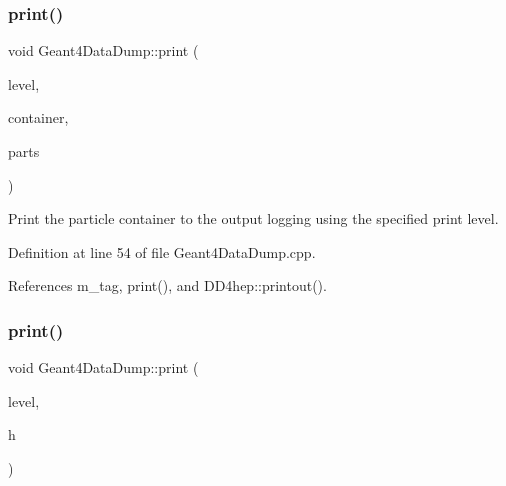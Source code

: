 \hypertarget{class_d_d4hep_1_1_simulation_1_1_geant4_data_dump_a50918352a7c46d20e94d26b4cf5d5e39}{}\label{class_d_d4hep_1_1_simulation_1_1_geant4_data_dump_a50918352a7c46d20e94d26b4cf5d5e39} 
\subsubsection{\texorpdfstring{print()}{print()}\hspace{0.1cm}{\footnotesize\ttfamily [2/6]}}
{\footnotesize\ttfamily void Geant4\+Data\+Dump\+::print (\begin{DoxyParamCaption}\item[{\hyperlink{namespace_d_d4hep_a5b5a64d56252469451f2020a27d57d42}{Print\+Level}}]{level,  }\item[{const std\+::string \&}]{container,  }\item[{const \hyperlink{class_d_d4hep_1_1_simulation_1_1_geant4_data_dump_a78b5910af0db1442a14600ae8dfc2a92}{Particles} $\ast$}]{parts }\end{DoxyParamCaption})}



Print the particle container to the output logging using the specified print level. 



Definition at line 54 of file Geant4\+Data\+Dump.\+cpp.



References m\+\_\+tag, print(), and D\+D4hep\+::printout().

\hypertarget{class_d_d4hep_1_1_simulation_1_1_geant4_data_dump_af3765022b8a03075fde40b2129b468e8}{}\label{class_d_d4hep_1_1_simulation_1_1_geant4_data_dump_af3765022b8a03075fde40b2129b468e8} 
\subsubsection{\texorpdfstring{print()}{print()}\hspace{0.1cm}{\footnotesize\ttfamily [3/6]}}
{\footnotesize\ttfamily void Geant4\+Data\+Dump\+::print (\begin{DoxyParamCaption}\item[{\hyperlink{namespace_d_d4hep_a5b5a64d56252469451f2020a27d57d42}{Print\+Level}}]{level,  }\item[{const \hyperlink{class_d_d4hep_1_1_simulation_1_1_geant4_data_dump_aaeea8b5b317a9a22e13f472200917ad2}{Tracker\+Hit} $\ast$}]{h }\end{DoxyParamCaption})}



